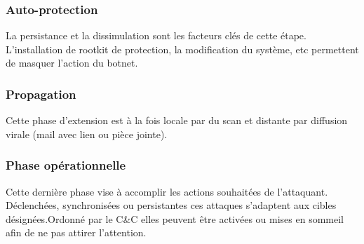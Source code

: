 \subsubsection{Auto-protection}
La persistance et la dissimulation sont les facteurs clés de cette étape. L'installation de rootkit de protection, la modification du système, etc permettent de masquer l'action du botnet.
	
\subsubsection{Propagation}
Cette phase d'extension est à la fois locale par du scan et distante par diffusion virale (mail avec lien ou pièce jointe).
	
\subsubsection{Phase opérationnelle}
Cette dernière phase vise à accomplir les actions souhaitées de l'attaquant. 
Déclenchées, synchronisées ou persistantes ces attaques s'adaptent aux cibles désignées.Ordonné par le C\&C elles peuvent être activées ou mises en sommeil afin de ne pas attirer l'attention.
